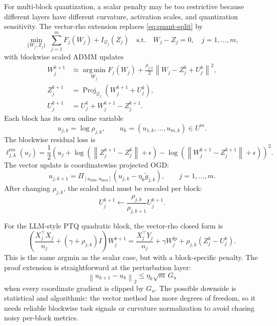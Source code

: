 \documentclass[11pt]{article}
\newcommand{\argmin}{\operatorname*{arg\,min}}
\newcommand{\proj}{\operatorname{Proj}}
\newcommand{\norm}[1]{\left\lVert #1 \right\rVert}
\newcommand{\Q}{\mathcal{Q}}
\begin{document}
For multi-block quantization, a scalar penalty may be too restrictive because
different layers have different curvature, activation scales, and
quantization sensitivity.  The vector-rho extension replaces
\eqref{eq:quant-split} by
\begin{equation}
    \min_{\{W_j,Z_j\}}\;
    \sum_{j=1}^m F_j(W_j)+I_{\Q_j}(Z_j)
    \quad\text{s.t.}\quad W_j-Z_j=0,\quad j=1,\ldots,m,
\end{equation}
with blockwise scaled ADMM updates
\begin{align}
    W_j^{k+1}
    &\approx
    \argmin_{W_j}
    F_j(W_j)
    +\frac{\rho_{j,k}}{2}
    \norm{W_j-Z_j^k+U_j^k}^2,\\
    Z_j^{k+1}
    &=
    \proj_{\Q_j}(W_j^{k+1}+U_j^k),\\
    U_j^{k+1}
    &=
    U_j^k+W_j^{k+1}-Z_j^{k+1}.
\end{align}
Each block has its own online variable
\[
    u_{j,k}=\log\rho_{j,k},
    \qquad
    u_k=(u_{1,k},\ldots,u_{m,k})\in U^m.
\]
The blockwise residual loss is
\begin{equation}
    \ell_{j,k}^{\mathrm{res}}(u_j)
    =
    \frac{1}{2}
    \left(
        u_j+\log(\norm{Z_j^{k+1}-Z_j^k}+\epsilon)
        -\log(\norm{W_j^{k+1}-Z_j^{k+1}}+\epsilon)
    \right)^2.
\end{equation}
The vector update is coordinatewise projected OGD:
\begin{equation}
    u_{j,k+1}
    =
    \Pi_{[u_{\min},u_{\max}]}
    \left(u_{j,k}-\eta_k \widetilde g_{j,k}\right),
    \qquad j=1,\ldots,m.
    \label{eq:vector-rho-update}
\end{equation}
After changing \(\rho_{j,k}\), the scaled dual must be rescaled per block:
\begin{equation}
    U_j^{k+1}
    \leftarrow
    \frac{\rho_{j,k}}{\rho_{j,k+1}}U_j^{k+1}.
    \label{eq:vector-dual-rescale}
\end{equation}

For the LLM-style PTQ quadratic block, the vector-rho closed form is
\begin{equation}
    \left(
        \frac{X_j^\top X_j}{n_j}
        +(\gamma+\rho_{j,k})I
    \right)
    W_j^{k+1}
    =
    \frac{X_j^\top Y_j}{n_j}
    +\gamma W_j^{\mathrm{fp}}
    +\rho_{j,k}(Z_j^k-U_j^k).
    \label{eq:vector-llm-ptq-w-update}
\end{equation}
This is the same argmin as the scalar case, but with a block-specific penalty.
The proof extension is straightforward at the perturbation layer:
\begin{equation}
    \norm{u_{k+1}-u_k}_2
    \le
    \eta_k \sqrt{m}\,G_u
\end{equation}
when every coordinate gradient is clipped by \(G_u\).  The possible downside is
statistical and algorithmic: the vector method has more degrees of freedom,
so it needs reliable blockwise task signals or curvature normalization to avoid
chasing noisy per-block metrics.
\end{document}
